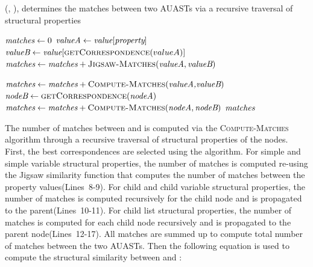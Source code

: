 \begin{algorithm}
  \caption{(, ), determines the matches between two AUASTs via a recursive traversal of structural properties}
  \label{computeMatches}
  \begin{algorithmic}[1]
  \ComputeMatch
  	   \EndIf
         \State $\textit{matches} \gets 0$
	\State $\textit{valueA} \gets \textit{value}[\textit{property}]$
	\State $\textit{valueB} \gets \textit{value}[\textsc{getCorrespondence}(valueA)]$
 \State $\textit{matches} \gets  \textit{matches} + \textsc{Jigsaw-Matches}(\textit{valueA}, \textit{valueB})$ 	    
	    
	          \State $\textit{matches} \gets  \textit{matches} +\textsc{Compute-Matches}(\textit{valueA,valueB})$		
		\State $\textit{nodeB} \gets \textsc{getCorrespondence}(\textit{nodeA})$    
	 \State $\textit{matches} \gets  \textit{matches} + \textsc{Compute-Matches}(\textit{nodeA}, \textit{nodeB})$
	  \EndFor 	
	   \EndIf
       \EndFor 	
	\Return $\textit{matches}$
  \end{algorithmic}
\end{algorithm}


The number of matches between  and  is computed via the \textsc{Compute-Matches} algorithm through a recursive traversal of structural properties of the nodes. First, the best correspondences are selected using the  algorithm. For simple and simple variable structural properties, the number of matches is computed re-using the Jigsaw similarity function that computes the number of matches between the property values(Lines~8-9). For child and child variable structural properties, the number of matches is computed recursively for the child node and is propagated to the parent(Lines~10-11). For child list structural properties, the number of matches is computed for each child node recursively and is propagated to the parent node(Lines~12-17). All matches are summed up to compute total number of matches between the two AUASTs. Then the following equation is used to compute the structural similarity between  and :


